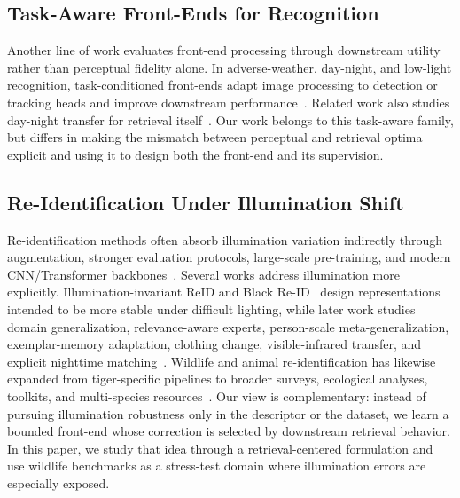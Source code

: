 \documentclass[sigconf,screen,review,anonymous]{acmart}
\begin{document}
\subsection{Task-Aware Front-Ends for Recognition}

Another line of work evaluates front-end processing through downstream utility
rather than perceptual fidelity alone.
In adverse-weather, day-night, and low-light recognition, task-conditioned
front-ends adapt image processing to detection or tracking heads and improve
downstream performance~\cite{lengyel2021physicsprior,liu2022imageadaptive,hashmi2023featenhancer,wu2023semanticaware,luo2023simminmax,du2024daynight,wang2024motdark}.
Related work also studies day-night transfer for retrieval itself~\cite{li2024dnvehicle}.
Our work belongs to this task-aware family, but differs in making the mismatch
between perceptual and retrieval optima explicit and using it to design both
the front-end and its supervision.

\subsection{Re-Identification Under Illumination Shift}

Re-identification methods often absorb illumination variation indirectly
through augmentation, stronger evaluation protocols, large-scale pre-training,
and modern CNN/Transformer backbones~\cite{zheng2015market,ristani2016performance,luo2019bag,zhou2019osnet,he2021transreid,zhou2021osnetain,fu2022pnl,dou2023isr,chen2023solider,zhu2024seas,ni2023partaware,he2024instructreid}.
Several works address illumination more explicitly.
Illumination-invariant ReID and Black Re-ID~\cite{huang2019illumination,xu2020blackreid}
design representations intended to be more stable under difficult lighting,
while later work studies domain generalization, relevance-aware experts,
person-scale meta-generalization, exemplar-memory adaptation, clothing change,
visible-infrared transfer, and explicit nighttime matching~\cite{zhao2021m3l,dai2021ramoe,bai2021person30k,zhong2019invariance,yang2020contour,ye2020ddag,wei2020coal,yang2022adca,xiang2022rethinking,jiang2025privacyvir,lu2024illuminationdistillation,lu2025nighttime}.
Wildlife and animal re-identification has likewise expanded from tiger-specific
pipelines to broader surveys, ecological analyses, toolkits, and multi-species
resources~\cite{freytag2016chimpanzee,liu2019pgcfl,liu2019ppgnet,li2020atrw,schneider2019past,schneider2022similarity,cermak2024wildlifedatasets,adam2024seaturtleid,nepovinnykh2024species,wahltinez2024opensource,moosa2024selfsupervised,hou2025openanimals,adam2025wildlifereid10k}.
Our view is complementary: instead of pursuing illumination robustness only in
the descriptor or the dataset, we learn a bounded front-end whose correction is
selected by downstream retrieval behavior.
In this paper, we study that idea through a retrieval-centered formulation and
use wildlife benchmarks as a stress-test domain where illumination errors are
especially exposed.
\end{document}
